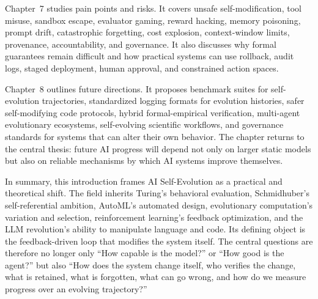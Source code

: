 Chapter~7 studies pain points and risks. It covers unsafe self-modification, tool misuse, sandbox escape, evaluator gaming, reward hacking, memory poisoning, prompt drift, catastrophic forgetting, cost explosion, context-window limits, provenance, accountability, and governance. It also discusses why formal guarantees remain difficult and how practical systems can use rollback, audit logs, staged deployment, human approval, and constrained action spaces.

Chapter~8 outlines future directions. It proposes benchmark suites for self-evolution trajectories, standardized logging formats for evolution histories, safer self-modifying code protocols, hybrid formal-empirical verification, multi-agent evolutionary ecosystems, self-evolving scientific workflows, and governance standards for systems that can alter their own behavior. The chapter returns to the central thesis: future AI progress will depend not only on larger static models but also on reliable mechanisms by which AI systems improve themselves.

In summary, this introduction frames AI Self-Evolution as a practical and theoretical shift. The field inherits Turing's behavioral evaluation, Schmidhuber's self-referential ambition, AutoML's automated design, evolutionary computation's variation and selection, reinforcement learning's feedback optimization, and the LLM revolution's ability to manipulate language and code. Its defining object is the feedback-driven loop that modifies the system itself. The central questions are therefore no longer only ``How capable is the model?'' or ``How good is the agent?'' but also ``How does the system change itself, who verifies the change, what is retained, what is forgotten, what can go wrong, and how do we measure progress over an evolving trajectory?''
